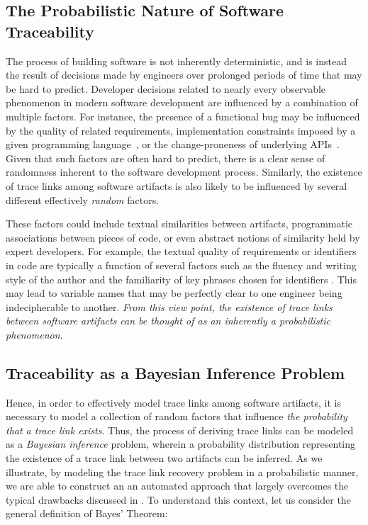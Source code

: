 \subsection{The Probabilistic Nature of Software Traceability}
The process of building software is not inherently deterministic, and is instead the result of decisions made by engineers over prolonged periods of time that may be hard to predict. Developer decisions related to nearly every observable phenomenon in modern software development are influenced by a combination of multiple factors. For instance, the presence of a functional bug may be influenced by the quality of related requirements, implementation constraints imposed by a given programming language~\citep{Ray:CACM'17}, or the change-proneness of underlying APIs~\citep{Linares-Vasquez:FSE'13}. Given that such factors are often hard to predict, there is a clear sense of randomness inherent to the software development process. Similarly, the existence of trace links among software artifacts is also likely to be influenced by several different effectively \textit{random} factors.  

These factors could include textual similarities between artifacts, programmatic associations between pieces of code, or even abstract notions of similarity held by expert developers.  For example, the textual quality of requirements or identifiers in code are typically a function of several factors such as the fluency and writing style of the author and the familiarity of key phrases chosen for identifiers \citep{Dasgupta:ICSME'13}. This may lead to variable names that may be perfectly clear to one engineer being indecipherable to another.  \textit{From this view point, the existence of trace links between software artifacts can be thought of as an inherently a probabilistic phenomenon}.

\subsection{Traceability as a Bayesian Inference Problem}

Hence, in order to effectively model trace links among software artifacts, it is necessary to model a collection of random factors that influence \textit{the probability that a trace link exists}. Thus, the process of deriving trace links can be modeled as a \textit{Bayesian inference} problem, wherein a probability distribution representing the existence of a trace link between two artifacts can be inferred. As we illustrate, by modeling the trace link recovery problem in a probabilistic manner, we are able to construct an an automated approach that largely overcomes the typical drawbacks discussed in . To understand this context, let us consider the general definition of Bayes' Theorem:

